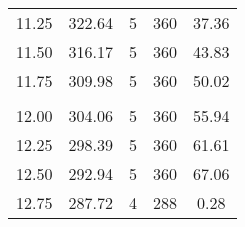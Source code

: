 \begin{table}[H]
{\begin{tabular}{ccccc}
            11.25                        & 322.64                     & 5                      & 360                            & 37.36                   \\
            11.50                        & 316.17                     & 5                      & 360                            & 43.83                   \\
            11.75                        & 309.98                     & 5                      & 360                            & 50.02                   \\
            \\
            12.00                        & 304.06                     & 5                      & 360                            & 55.94                   \\
            12.25                        & 298.39                     & 5                      & 360                            & 61.61                   \\
            12.50                        & 292.94                     & 5                      & 360                            & 67.06                   \\
            12.75                        & 287.72                     & 4                      & 288                            & 0.28                    \\
            \bottomrule
        \end{tabular}
    }
\end{table}
